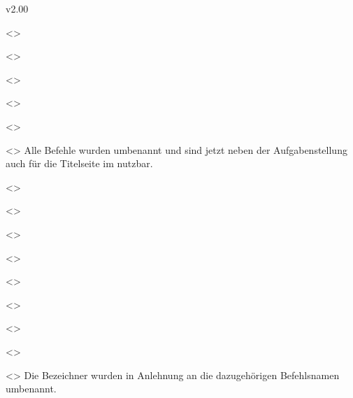 \begin{Changes}{v2.00}
\begin{Entity}{}
\begin{Obsolete}
  {}
  <>
\begin{Obsolete}
  {}
  <>
\begin{Obsolete}
  {}
  <>
\begin{Obsolete}
  {}
  <>
\begin{Obsolete}
  {}
  <>
\begin{Obsolete}
  {}
  <>
\printdeclarationlist
%
Alle Befehle wurden umbenannt und sind jetzt neben der Aufgabenstellung auch 
für die Titelseite im \CD nutzbar.
\end{Obsolete}
\end{Obsolete}
\end{Obsolete}
\end{Obsolete}
\end{Obsolete}
\end{Obsolete}

\begin{Obsolete}
  {}
  <>
\begin{Obsolete}
  {}
  <>
\begin{Obsolete}
  {}
  <>
\begin{Obsolete}
  {}
  <>
\begin{Obsolete}
  {}
  <>
\begin{Obsolete}
  {}
  <>
\begin{Obsolete}
  {}
  <>
\begin{Obsolete}
  {}
  <>
\begin{Obsolete}
  {}
  <>
\printdeclarationlist
%
Die Bezeichner wurden in Anlehnung an die dazugehörigen Befehlsnamen umbenannt.
\end{Obsolete}
\end{Obsolete}
\end{Obsolete}
\end{Obsolete}
\end{Obsolete}
\end{Obsolete}
\end{Obsolete}
\end{Obsolete}
\end{Obsolete}
\end{Entity}
\end{Changes}



